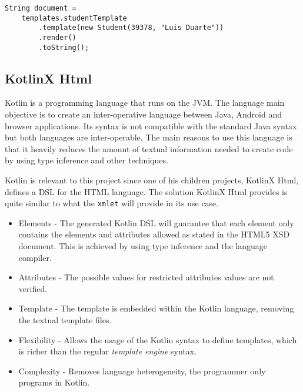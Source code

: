 
\begin{minipage}{\linewidth}
\begin{lstlisting}[caption={Rocker Use Example}, label={lst:rockerusage}]
String document =
    templates.studentTemplate
        .template(new Student(39378, "Luis Duarte"))
        .render()
        .toString();
\end{lstlisting}
\end{minipage}

\subsection{KotlinX Html}
\label{sec:kotlinx}

Kotlin\cite{kotlin} is a programming language that runs on the \ac{JVM}. The language main objective is to create an inter-operative language between Java, Android and browser applications. Its syntax is not compatible with the standard Java syntax but both languages are inter-operable. The main reasons to use this language is that it heavily reduces the amount of textual information needed to create code by using type inference and other techniques. 

\noindent
Kotlin is relevant to this project since one of his children projects, KotlinX Html, defines a \ac{DSL} for the \ac{HTML} language. The solution KotlinX Html provides is quite similar to what the \texttt{xmlet} will provide in its use case. 

\begin{itemize}
	\item Elements - The generated Kotlin \ac{DSL} will guarantee that each element only contains the elements and attributes allowed as stated in the \ac{HTML}5 \ac{XSD} document. This is achieved by using type inference and the language compiler.
	\item Attributes - The possible values for restricted attributes values are not verified.
	\item Template - The template is embedded within the Kotlin language, removing the textual template files.
	\item Flexibility - Allows the usage of the Kotlin syntax to define templates, which is richer than the regular \textit{template engine} syntax.
	\item Complexity - Removes language heterogeneity, the programmer only programs in Kotlin.
\end{itemize}

